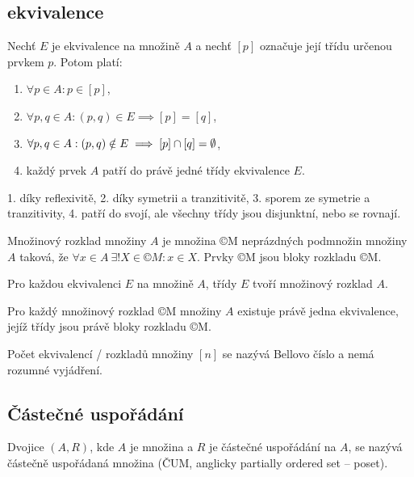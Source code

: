 \documentclass[12pt]{article}					%
\begin{document}
    \subsection{ekvivalence}
    \begin{veta}
        Nechť $E$ je ekvivalence na množině $A$ a nechť $[p]$ označuje její třídu určenou prvkem $p$. Potom platí:
        \begin{enumerate}
            \item $\forall p \in A: p \in [p]$,
            \item $\forall p, q \in A: (p, q) \in E \implies [p] = [q]$,
            \item $\forall p, q \in A: (p, q) \notin E \implies [p] \cap [q] = \emptyset$,
            \item každý prvek $A$ patří do právě jedné třídy ekvivalence $E$.
        \end{enumerate}

        \begin{dukazin}
            1. díky reflexivitě, 2. díky symetrii a tranzitivitě, 3. sporem ze symetrie a tranzitivity, 4. patří do svojí, ale všechny třídy jsou disjunktní, nebo se rovnají.
        \end{dukazin}
    \end{veta}

    \begin{definice}
        Množinový rozklad množiny $A$ je množina ©M neprázdných podmnožin množiny $A$ taková, že $\forall x \in A\ \exists! X \in ©M: x \in X$. Prvky ©M jsou bloky rozkladu ©M.
    \end{definice}

    \begin{poznamka}[2 pozorování]
        Pro každou ekvivalenci $E$ na množině $A$, třídy $E$ tvoří množinový rozklad $A$.

        Pro každý množinový rozklad ©M množiny $A$ existuje právě jedna ekvivalence, jejíž třídy jsou právě bloky rozkladu ©M.
    \end{poznamka}

    \begin{poznamka}[*]
        Počet ekvivalencí / rozkladů množiny $[n]$ se nazývá Bellovo číslo a nemá rozumné vyjádření.
    \end{poznamka}

    \subsection{Částečné uspořádání}
    \begin{definice}
        Dvojice $(A, R)$, kde $A$ je množina a $R$ je částečné uspořádání na $A$, se nazývá částečně uspořádaná množina (ČUM, anglicky partially ordered set -- poset).
    \end{definice}
\end{document}
